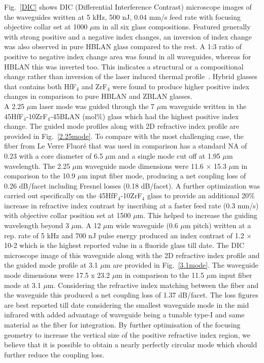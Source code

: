 \documentclass[11pt]{article}
\begin{document}
Fig.~\ref{DIC} shows DIC (Differential Interference Contrast) microscope images of the waveguides written at 5 kHz, 500 nJ, 0.04 mm/s feed rate with focusing objective collar set at 1000 $\mu$m in all six glass compositions. Featured generally with strong positive and a negative index changes, an inversion of index change was also observed in pure HBLAN glass compared to the rest. A 1:3 ratio of positive to negative index change area was found in all waveguides, whereas for HBLAN this was inverted too. This indicates a structural or a compositional change rather than inversion of the laser induced thermal profile~\cite{Fernandez_2015,Song2011}. Hybrid glasses that contains both HfF$_4$ and ZrF$_4$ were found to produce higher positive index changes in comparison to pure HBLAN and ZBLAN glasses.
\\A 2.25 $\mu$m laser mode was guided through the 7 $\mu$m waveguide written in the 45HfF$_4$-10ZrF$_4$-45BLAN (mol$\%$) glass which had the highest positive index change. The guided mode profiles along with 2D refractive index profile are provided in Fig.~\ref{2.25mode}. To compare with the most challenging case, the fiber from Le Verre Fluoré that was used in comparison has a standard NA of 0.23 with a core diameter of 6.5 $\mu$m and a single mode cut off at 1.95 $\mu$m wavelength. The 2.25 $\mu$m waveguide mode dimensions were 11.6 $\times$ 15.3 $\mu$m in comparison to the 10.9 $\mu$m input fiber mode, producing a net coupling loss of 0.26 dB/facet including Fresnel losses (0.18 dB/facet). A further optimization was carried out specifically on the 45HfF$_4$-10ZrF$_4$ glass to provide an additional 20\% increase in refractive index contrast by inscribing at a faster feed rate (0.3 mm/s) with objective collar position set at 1500 $\mu$m. This helped to increase the guiding wavelength beyond 3 $\mu$m. A 12 $\mu$m wide waveguide (0.6 $\mu$m pitch) written at a rep. rate of 5 kHz and 700 nJ pulse energy produced an index contrast of 1.2 × 10-2 which is the highest reported value in a fluoride glass till date. The DIC microscope image of this waveguide along with the 2D refractive index profile and the guided mode profile at 3.1 $\mu$m are provided in Fig.~\ref{3.1mode}. The waveguide mode dimensions were 17.5 x 23.2 $\mu$m in comparison to the 11.5 $\mu$m input fiber mode at 3.1 $\mu$m. Considering the refractive index matching between the fiber and the waveguide this produced a net coupling loss of 1.37 dB/facet. The loss figures are best reported till date considering the smallest waveguide mode in the mid infrared with added advantage of waveguide being a tunable type-I and same material as the fiber for integration. By further optimisation of the focusing geometry to increase the vertical size of the positive refractive index region, we believe that it is possible to obtain a nearly perfectly circular mode which should further reduce the coupling loss.
\end{document}
